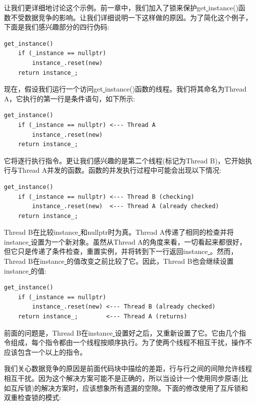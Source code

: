 让我们更详细地讨论这个示例。前一章中，我们加入了锁来保护get\underline{ }instance()函数不受数据竞争的影响。让我们详细说明一下这样做的原因。为了简化这个例子，下面是我们感兴趣部分的四行伪码: \par

\begin{lstlisting}[caption={}]
get_instance()
	if (_instance == nullptr)
		instance_.reset(new)
	return instance_;
\end{lstlisting}

现在，假设我们运行一个访问get\underline{ }instance()函数的线程。我们将其命名为Thread A，它执行的第一行是条件语句，如下所示: \par

\begin{lstlisting}[caption={}]
get_instance()
	if (_instance == nullptr) <--- Thread A
		instance_.reset(new)
	return instance_;
\end{lstlisting}

它将逐行执行指令。更让我们感兴趣的是第二个线程(标记为Thread B)，它开始执行与Thread A并发的函数。函数的并发执行过程中可能会出现以下情况: \par

\begin{lstlisting}[caption={}]
get_instance()
	if (_instance == nullptr) <--- Thread B (checking)
		instance_.reset(new)  <--- Thread A (already checked)
	return instance_;
\end{lstlisting}

Thread B在比较instance\underline{ }和nullptr时为真。Thread A传递了相同的检查并将instance\underline{ }设置为一个新对象。虽然从Thread A的角度来看，一切看起来都很好，但它只是传递了条件检查，重置实例，并将转到下一行返回instance\underline{ }。然而，Thread B在instance\underline{ }的值改变之前比较了它。因此，Thread B也会继续设置instance\underline{ }的值: \par

\begin{lstlisting}[caption={}]
get_instance()
	if (_instance == nullptr)
		instance_.reset(new) <--- Thread B (already checked)
	return instance_; 		 <--- Thread A (returns)
\end{lstlisting}

前面的问题是，Thread B在instance\underline{ }设置好之后，又重新设置了它。它由几个指令组成，每个指令都由一个线程按顺序执行。为了使两个线程不相互干扰，操作不应该包含一个以上的指令。 \par
我们关心数据竞争的原因是前面代码块中描绘的差距，行与行之间的间隙允许线程相互干扰。因为这个解决方案可能不是正确的，所以当设计一个使用同步原语(比如互斥锁)的解决方案时，应该想象所有遗漏的空隙。下面的修改使用了互斥锁和双重检查锁的模式: \par


